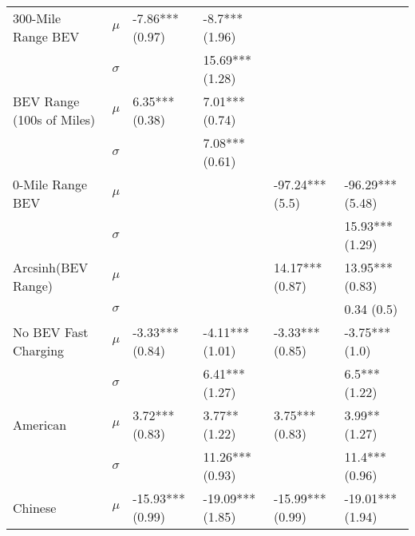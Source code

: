 \begin{tabular}{llllll}
       300-Mile Range BEV &     $\mu$ &               -7.86*** (0.97) &                -8.7*** (1.96) &                                &                                \\
                          &  $\sigma$ &                               &               15.69*** (1.28) &                                &                                \\
BEV Range (100s of Miles) &     $\mu$ &                6.35*** (0.38) &                7.01*** (0.74) &                                &                                \\
                          &  $\sigma$ &                               &                7.08*** (0.61) &                                &                                \\
         0-Mile Range BEV &     $\mu$ &                               &                               &                -97.24*** (5.5) &               -96.29*** (5.48) \\
                          &  $\sigma$ &                               &                               &                                &                15.93*** (1.29) \\
       Arcsinh(BEV Range) &     $\mu$ &                               &                               &                14.17*** (0.87) &                13.95*** (0.83) \\
                          &  $\sigma$ &                               &                               &                                &                     0.34 (0.5) \\
     No BEV Fast Charging &     $\mu$ &               -3.33*** (0.84) &               -4.11*** (1.01) &                -3.33*** (0.85) &                 -3.75*** (1.0) \\
                          &  $\sigma$ &                               &                6.41*** (1.27) &                                &                  6.5*** (1.22) \\
                 American &     $\mu$ &                3.72*** (0.83) &                 3.77** (1.22) &                 3.75*** (0.83) &                  3.99** (1.27) \\
                          &  $\sigma$ &                               &               11.26*** (0.93) &                                &                 11.4*** (0.96) \\
                  Chinese &     $\mu$ &              -15.93*** (0.99) &              -19.09*** (1.85) &               -15.99*** (0.99) &               -19.01*** (1.94) \\

\end{tabular}
